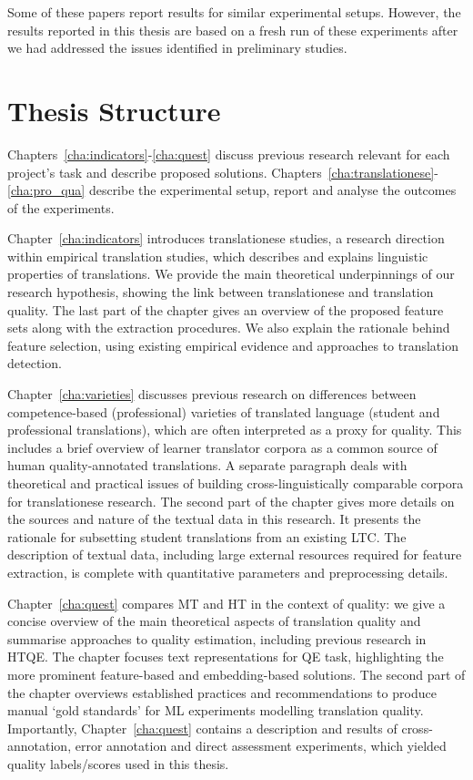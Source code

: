Some of these papers report results for similar experimental setups. However, the results reported in this thesis are based on a fresh run of these experiments after we had addressed the issues identified in preliminary studies. 

\section{\label{sec:structure}Thesis Structure}

Chapters~\ref{cha:indicators}-\ref{cha:quest} discuss previous research relevant for each project's task and describe proposed solutions. Chapters~\ref{cha:translationese}-\ref{cha:pro_qua} describe the experimental setup, report and analyse the outcomes of the experiments. 

Chapter~\ref{cha:indicators} introduces translationese studies, a research direction within empirical translation studies, which describes and explains linguistic properties of translations. We provide the main theoretical underpinnings of our research hypothesis, showing the link between translationese and translation quality. The last part of the chapter gives an overview of the proposed feature sets along with the extraction procedures. We also explain the rationale behind feature selection, using existing empirical evidence and approaches to translation detection.
 
Chapter~\ref{cha:varieties} discusses previous research on differences between competence-based (professional) varieties of translated language (student and professional translations), which are often interpreted as a proxy for quality. This includes a brief overview of learner translator corpora as a common source of human quality-annotated translations.
A separate paragraph deals with theoretical and practical issues of building cross-linguistically comparable corpora for translationese research.  
The second part of the chapter gives more details on the sources and nature of the textual data in this research. It presents the rationale for subsetting student translations from an existing \gls{LTC}. The description of textual data, including large external resources required for feature extraction, is complete with quantitative parameters and preprocessing details.

Chapter~\ref{cha:quest} compares MT and \gls{HT} in the context of quality: we give a concise overview of the main theoretical aspects of translation quality and summarise approaches to quality estimation, including previous research in \gls{HTQE}. The chapter focuses text representations for QE task, highlighting the more prominent feature-based and embedding-based solutions. The second part of the chapter overviews established practices and recommendations to produce manual `gold standards' for ML experiments modelling translation quality. Importantly, Chapter~\ref{cha:quest} contains a description and results of cross-annotation, error annotation and direct assessment experiments, which yielded quality labels/scores used in this thesis.

